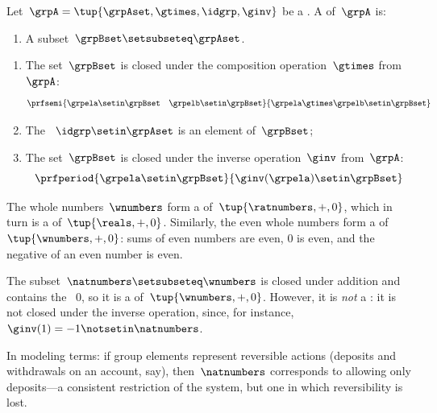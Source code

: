 \begin{ctdefinition}[Subgroup]\label{def:subgroup}
    Let~$\grpA = \tup{\grpAset, \gtimes, \idgrp, \ginv}$ be a .
    A  of~$\grpA$ is:

    \constit

    \begin{enumerate}
        \item A subset~$\grpBset \setsubseteq \grpAset$.
    \end{enumerate}

    \condit

    \begin{enumerate}
        \item The set~$\grpBset$ is closed under the composition operation~$\gtimes$ from~$\grpA$:
              \begin{equation}
                  \prfsemi{
                      \grpela \setin \grpBset \quad \grpelb \setin \grpBset
                  }{
                      \grpela \gtimes \grpelb \setin \grpBset
                  }
              \end{equation}

        \item The ~$\idgrp \setin \grpAset$ is an element of~$\grpBset$;

        \item The set~$\grpBset$ is closed under the inverse operation~$\ginv$ from~$\grpA$:
              \begin{equation}
                  \prfperiod{
                      \grpela \setin \grpBset
                  }{
                      \ginv(\grpela) \setin \grpBset
                  }
              \end{equation}
    \end{enumerate}
\end{ctdefinition}

\begin{example}
    The whole numbers~$\wnumbers$ form a  of~$\tup{\ratnumbers, +, 0}$, which in turn is a  of~$\tup{\reals, +, 0}$.
    Similarly, the even whole numbers form a  of~$\tup{\wnumbers, +, 0}$: sums of even numbers are even, $0$ is even, and the negative of an even number is even.
\end{example}

\begin{example}
    \label{exa:natnum-not-subgroup}
    The subset~$\natnumbers \setsubseteq \wnumbers$ is closed under addition and contains the ~$0$, so it is a  of~$\tup{\wnumbers, +, 0}$.
    However, it is \emph{not} a : it is not closed under the inverse operation, since, for instance, $\ginv(1) = -1 \notsetin \natnumbers$.

    In modeling terms: if group elements represent reversible actions (deposits and withdrawals on an account, say), then~$\natnumbers$ corresponds to allowing only deposits---a consistent restriction of the system, but one in which reversibility is lost.
\end{example}

